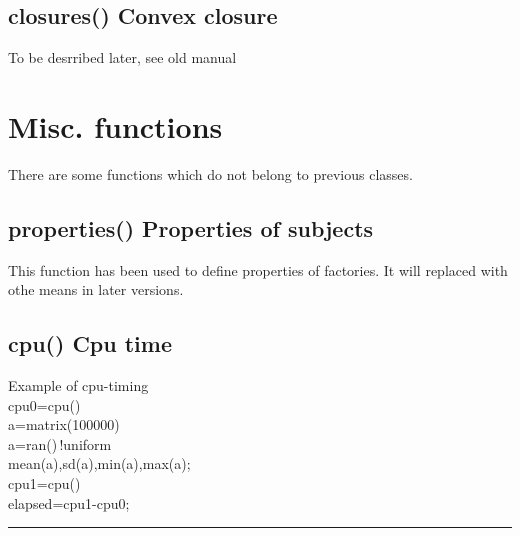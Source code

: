 \subsection{\textcolor{VioletRed}{closures}() Convex closure} 
\label{closures} 
To be desrribed later,  see old manual 
\section{Misc. functions} 
\label{misc} 
There are some functions which do not belong to previous classes. 
\subsection{\textcolor{VioletRed}{properties}() Properties of subjects} 
\label{properties} 
This function has been used to define properties of factories. 
It will replaced with othe means in later versions. 
\subsection{\textcolor{VioletRed}{cpu}() Cpu time} 
\label{cpu} 
\singlespacing 
\begin{example}[cpuex]Example of cpu-timing\\ 
\label{cpuex} 
\noindent cpu0=\textcolor{VioletRed}{cpu}()\\ 
a=\textcolor{VioletRed}{matrix}(100000)\\ 
a=\textcolor{VioletRed}{ran}()\,{\color{ForestGreen}!uniform}\\ 
\textcolor{VioletRed}{mean}(a),\textcolor{VioletRed}{sd}(a),\textcolor{VioletRed}{min}(a),\textcolor{VioletRed}{max}(a);\\ 
cpu1=\textcolor{VioletRed}{cpu}()\\ 
elapsed=cpu1-cpu0;\\ 
\end{example} 
\vspace{-7mm} \rule{5cm}{0.1pt} 
\onehalfspacing 
